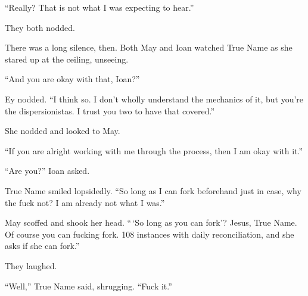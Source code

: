 ``Really? That is not what I was expecting to hear.''

They both nodded.

There was a long silence, then. Both May and Ioan watched True Name as she stared up at the ceiling, unseeing.

``And you are okay with that, Ioan?''

Ey nodded. ``I think so. I don't wholly understand the mechanics of it, but you're the dispersionistas. I trust you two to have that covered.''

She nodded and looked to May.

``If you are alright working with me through the process, then I am okay with it.''

``Are you?'' Ioan asked.

True Name smiled lopsidedly. ``So long as I can fork beforehand just in case, why the fuck not? I am already not what I was.''

May scoffed and shook her head. ``\,`So long as you can fork'? Jesus, True Name. Of course you can fucking fork. 108 instances with daily reconciliation, and she asks if she can fork.''

They laughed.

``Well,'' True Name said, shrugging. ``Fuck it.''
